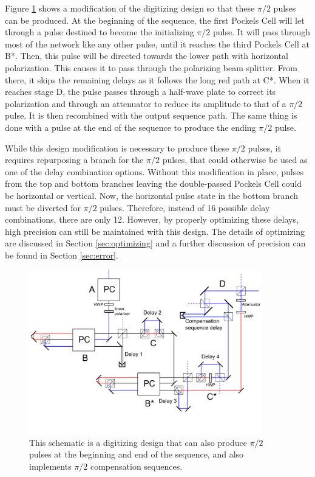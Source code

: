 \documentclass[pdftex,12pt,a4paper]{article}
\begin{document}
Figure \ref{fig:digitizing_pi2} shows a modification of the digitizing design so that these $\pi/2$ pulses can be produced. At the beginning of the sequence, the first Pockels Cell will let through a pulse destined to become the initializing $\pi/2$ pulse. It will pass through most of the network like any other pulse, until it reaches the third Pockels Cell at B*. Then, this pulse will be directed towards the lower path with horizontal polarization. This causes it to pass through the polarizing beam splitter. From there, it skips the remaining delays as it follows the long red path at C*. When it reaches stage D, the pulse passes through a half-wave plate to correct its polarization and through an attenuator to reduce its amplitude to that of a $\pi/2$ pulse. It is then recombined with the output sequence path. The same thing is done with a pulse at the end of the sequence to produce the ending $\pi/2$ pulse.

While this design modification is necessary to produce these $\pi/2$ pulses, it requires repurposing a branch for the $\pi/2$ pulses, that could otherwise be used as one of the delay combination options. Without this modification in place, pulses from the top and bottom branches leaving the double-passed Pockels Cell could be horizontal or vertical. Now, the horizontal pulse state in the bottom branch must be diverted for $\pi/2$ pulses. Therefore, instead of 16 possible delay combinations, there are only 12. However, by properly optimizing these delays, high precision can still be maintained with this design. The details of optimizing are discussed in Section \ref{sec:optimizing} and a further discussion of precision can be found in Section \ref{sec:error}.

\begin{figure}[H]
\centering
\includegraphics[width=0.9\textwidth]{digitizing_pi2.png}
\caption{This schematic is a digitizing design that can also produce $\pi/2$ pulses at the beginning and end of the sequence, and also implements $\pi/2$ compensation sequences.}
\label{fig:digitizing_pi2}
\end{figure}
\end{document}
